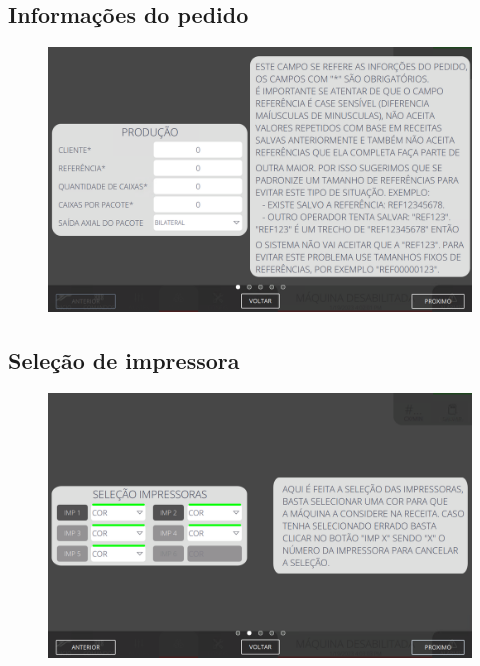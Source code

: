 \thispagestyle{fancy}
\vspace{\fill}
\subsection{\small Informações do pedido}
\begin{figure}
    \centering
    \includegraphics[width=480 px,height=300 px]{src/imagesICV/09-request/new/e-1-COM-ERRO-DIGITAÇÃO.png}
\end{figure}
\newpage

\thispagestyle{fancy}
\vspace{\fill}
\subsection{\small Seleção de impressora}
\begin{figure}
    \centering
    \includegraphics[width=576 px,height=360 px]{src/imagesICV/09-request/new/e-2.png}
\end{figure}
\newpage


